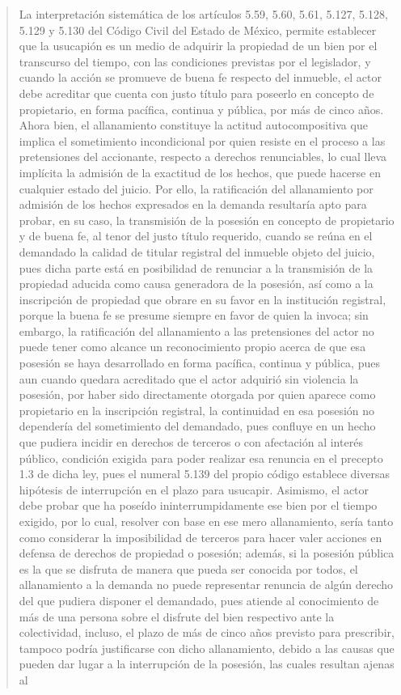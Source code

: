 \documentclass[11pt,a4paper]{article}
\begin{document}
\begin{quote}
La interpretación sistemática de los artículos 5.59, 5.60, 5.61, 5.127, 5.128, 5.129 y 5.130 del
Código Civil del Estado de México, permite establecer que la usucapión es un medio de adquirir la
propiedad de un bien por el transcurso del tiempo, con las condiciones previstas por el legislador, y
cuando la acción se promueve de buena fe respecto del inmueble, el actor debe acreditar que
cuenta con justo título para poseerlo en concepto de propietario, en forma pacífica, continua y
pública, por más de cinco años. Ahora bien, el allanamiento constituye la actitud autocompositiva
que implica el sometimiento incondicional por quien resiste en el proceso a las pretensiones del
accionante, respecto a derechos renunciables, lo cual lleva implícita la admisión de la exactitud de
los hechos, que puede hacerse en cualquier estado del juicio. Por ello, la ratificación del
allanamiento por admisión de los hechos expresados en la demanda resultaría apto para probar, en
su caso, la transmisión de la posesión en concepto de propietario y de buena fe, al tenor del justo
título requerido, cuando se reúna en el demandado la calidad de titular registral del inmueble objeto
del juicio, pues dicha parte está en posibilidad de renunciar a la transmisión de la propiedad aducida
como causa generadora de la posesión, así como a la inscripción de propiedad que obrare en su
favor en la institución registral, porque la buena fe se presume siempre en favor de quien la invoca;
sin embargo, la ratificación del allanamiento a las pretensiones del actor no puede tener como
alcance un reconocimiento propio acerca de que esa posesión se haya desarrollado en forma
pacífica, continua y pública, pues aun cuando quedara acreditado que el actor adquirió sin violencia
la posesión, por haber sido directamente otorgada por quien aparece como propietario en la
inscripción registral, la continuidad en esa posesión no dependería del sometimiento del
demandado, pues confluye en un hecho que pudiera incidir en derechos de terceros o con
afectación al interés público, condición exigida para poder realizar esa renuncia en el precepto 1.3
de dicha ley, pues el numeral 5.139 del propio código establece diversas hipótesis de interrupción
en el plazo para usucapir. Asimismo, el actor debe probar que ha poseído ininterrumpidamente ese
bien por el tiempo exigido, por lo cual, resolver con base en ese mero allanamiento, sería tanto
como considerar la imposibilidad de terceros para hacer valer acciones en defensa de derechos de
propiedad o posesión; además, si la posesión pública es la que se disfruta de manera que pueda
ser conocida por todos, el allanamiento a la demanda no puede representar renuncia de algún
derecho del que pudiera disponer el demandado, pues atiende al conocimiento de más de una
persona sobre el disfrute del bien respectivo ante la colectividad, incluso, el plazo de más de cinco
años previsto para prescribir, tampoco podría justificarse con dicho allanamiento, debido a las
causas que pueden dar lugar a la interrupción de la posesión, las cuales resultan ajenas al



\end{quote}
\end{document}
